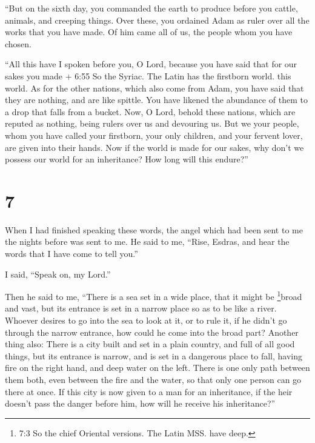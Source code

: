  ``But on the sixth day, you commanded the earth to produce
before you cattle, animals, and creeping things.  Over
these, you ordained Adam as ruler over all the works that you have made.
Of him came all of us, the people whom you have chosen.

 ``All this have I spoken before you, O Lord, because you
have said that for our sakes you made + 6:55 So the Syriac. The Latin
has the firstborn world. this world.  As for the other
nations, which also come from Adam, you have said that they are nothing,
and are like spittle. You have likened the abundance of them to a drop
that falls from a bucket.  Now, O Lord, behold these
nations, which are reputed as nothing, being rulers over us and
devouring us.  But we your people, whom you have called
your firstborn, your only children, and your fervent lover, are given
into their hands.  Now if the world is made for our sakes,
why don't we possess our world for an inheritance? How long will this
endure?''

\hypertarget{section-6}{%
\section{7}\label{section-6}}

 When I had finished speaking these words, the angel which
had been sent to me the nights before was sent to me.  He
said to me, ``Rise, Esdras, and hear the words that I have come to tell
you.''

 I said, ``Speak on, my Lord.''

Then he said to me, ``There is a sea set in a wide place, that it might
be \footnote{7:3 So the chief Oriental versions. The Latin MSS. have
  deep.}broad and vast,  but its entrance is set in a narrow
place so as to be like a river.  Whoever desires to go into
the sea to look at it, or to rule it, if he didn't go through the narrow
entrance, how could he come into the broad part?  Another
thing also: There is a city built and set in a plain country, and full
of all good things,  but its entrance is narrow, and is set
in a dangerous place to fall, having fire on the right hand, and deep
water on the left.  There is one only path between them
both, even between the fire and the water, so that only one person can
go there at once.  If this city is now given to a man for an
inheritance, if the heir doesn't pass the danger before him, how will he
receive his inheritance?''

